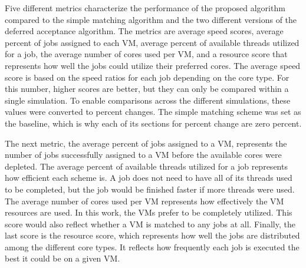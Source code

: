 \documentclass[conference]{IEEEtran}
\begin{document}
Five different metrics characterize the performance of the proposed algorithm compared to the simple matching algorithm
and the two different versions of the deferred acceptance algorithm.  
The metrics are average speed scores, average percent of jobs assigned to each VM, average percent of available threads utilized for a job, 
the average number of cores used per VM, and a resource score that represents how well the jobs could utilize their preferred cores.  
The average speed score is based on the speed ratios for each job depending on the core type.  
For this number, higher scores are better, but they can only be compared within a single simulation.  
To enable comparisons across the different simulations, these values were converted to percent changes.  
The simple matching scheme was set as the baseline, which is why each of its sections for percent change
are zero percent.

The next metric, the average percent of jobs assigned to a VM,
represents the number of jobs successfully assigned to a VM before the available cores were depleted.  
The average percent of available threads utilized for a job represents how efficient each scheme is.  
A job does not need to have all of its threads used to be completed, but the job would be finished faster if more threads were used.  
The average number of cores used per VM represents how effectively the VM resources are used.
In this work, the VMs prefer to be completely utilized. 
This score would also reflect whether a VM is matched to any jobs at all.
Finally, the last score is the resource score, which represents how well the jobs are distributed among the different core types.  
It reflects how frequently each job is executed the best it could be on a given VM. 
\end{document}
